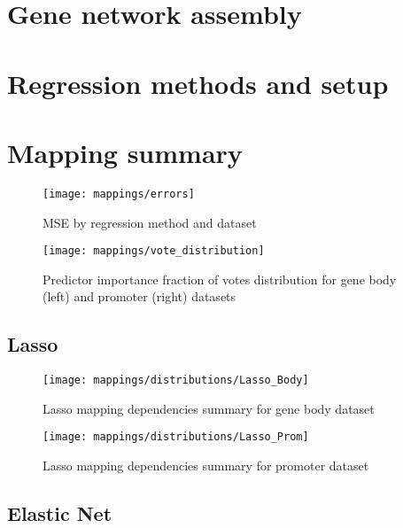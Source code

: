 \section{Gene network assembly} \label{sec_netwk}

\pagebreak
\section{Regression methods and setup}

\section{Mapping summary}

\pagebreak

\begin{figure}[H]
	\centering
	\texttt{[image: mappings/errors]}
	\caption{MSE by regression method and dataset}
	\label{fig:map_errors}
\end{figure}

\pagebreak

\begin{figure}[H]
	\centering
	\texttt{[image: mappings/vote\_distribution]}
	\caption{Predictor importance fraction of votes distribution for gene body (left) and promoter (right) datasets}
	\label{fig:map_vote_dist}
\end{figure}


\pagebreak
\subsection{Lasso}

\begin{figure}[H]
	\centering
	\texttt{[image: mappings/distributions/Lasso\_Body]}
	\caption{Lasso mapping dependencies summary for gene body dataset}
	\label{fig:map_body_lasso}
\end{figure}

\begin{figure}[H]
	\centering
	\texttt{[image: mappings/distributions/Lasso\_Prom]}
	\caption{Lasso mapping dependencies summary for promoter dataset}
	\label{fig:map_prom_lasso}
\end{figure}


\pagebreak
\subsection{Elastic Net}

